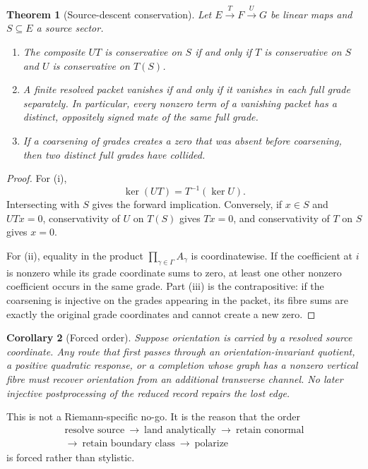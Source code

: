 \documentclass[11pt]{article}
\newtheorem{theorem}{Theorem}[section]
\newtheorem{corollary}[theorem]{Corollary}
\theoremstyle{definition}
\theoremstyle{remark}
\begin{document}
\begin{theorem}[Source-descent conservation]
\label{thm:source-descent}
Let \(E\xrightarrow{T}F\xrightarrow{U}G\) be linear maps and
\(S\subseteq E\) a source sector.
\begin{enumerate}[label=\textup{(\roman*)}]
\item The composite \(UT\) is conservative on \(S\) if and only if
      \(T\) is conservative on \(S\) and \(U\) is conservative on
      \(T(S)\).
\item A finite resolved packet vanishes if and only if it vanishes in each
      full grade separately.  In particular, every nonzero term of a
      vanishing packet has a distinct, oppositely signed mate of the same
      full grade.
\item If a coarsening of grades creates a zero that was absent before
      coarsening, then two distinct full grades have collided.
\end{enumerate}
\end{theorem}

\begin{proof}
For (i),
\[
 \ker(UT)=T^{-1}(\ker U).
\]
Intersecting with \(S\) gives the forward implication.  Conversely, if
\(x\in S\) and \(UTx=0\), conservativity of \(U\) on \(T(S)\) gives
\(Tx=0\), and conservativity of \(T\) on \(S\) gives \(x=0\).

For (ii), equality in the product \(\prod_{\gamma\in\Gamma}A_\gamma\) is
coordinatewise.  If the coefficient at \(i\) is nonzero while its grade
coordinate sums to zero, at least one other nonzero coefficient occurs in
the same grade.  Part (iii) is the contrapositive: if the coarsening is
injective on the grades appearing in the packet, its fibre sums are exactly
the original grade coordinates and cannot create a new zero.
\end{proof}

\begin{corollary}[Forced order]
\label{cor:forced-order}
Suppose orientation is carried by a resolved source coordinate.  Any route
that first passes through an orientation-invariant quotient, a positive
quadratic response, or a completion whose graph has a nonzero vertical
fibre must recover orientation from an additional transverse channel.  No
later injective postprocessing of the reduced record repairs the lost edge.
\end{corollary}

This is not a Riemann-specific no-go.  It is the reason that the order
\[
 \boxed{\begin{gathered}
   \text{resolve source}\ \longrightarrow\
   \text{land analytically}\ \longrightarrow\
   \text{retain conormal}\\[-1mm]
   \longrightarrow\ \text{retain boundary class}\
   \longrightarrow\ \text{polarize}
 \end{gathered}}
\tag{2.1}\label{eq:forced-order}
\]
is forced rather than stylistic.
\end{document}
